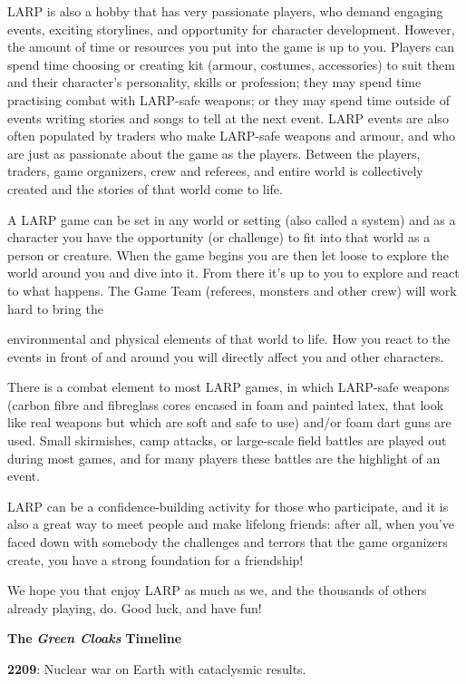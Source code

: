 \documentclass{scrbook}
\begin{document}
LARP is also a hobby that has very passionate players, who demand engaging events, exciting storylines, and opportunity for character development. However, the amount of time or resources you put into the game is up to you. Players can spend time choosing or creating kit (armour, costumes, accessories) to suit them and their character's personality, skills or profession; they may spend time practising combat with LARP-safe weapons; or they may spend time outside of events writing stories and songs to tell at the next event. LARP events are also often populated by traders who make LARP-safe weapons and armour, and who are just as passionate about the game as the players. Between the players, traders, game organizers, crew and referees, and entire world is collectively created and the stories of that world come to life.

A LARP game can be set in any world or setting (also called a system) and as a character you have the opportunity (or challenge) to fit into that world as a person or creature. When the game begins you are then let loose to explore the world around you and dive into it. From there it's up to you to explore and react to what happens. The Game Team (referees, monsters and other crew) will work hard to bring the

environmental and physical elements of that world to life. How you react to the events in front of and around you will directly affect you and other characters.

There is a combat element to most LARP games, in which LARP-safe weapons (carbon fibre and fibreglass cores encased in foam and painted latex, that look like real weapons but which are soft and safe to use) and/or foam dart guns are used. Small skirmishes, camp attacks, or large-scale field battles are played out during most games, and for many players these battles are the highlight of an event.

LARP can be a confidence-building activity for those who participate, and it is also a great way to meet people and make lifelong friends: after all, when you've faced down with somebody the challenges and terrors that the game organizers create, you have a strong foundation for a friendship!

We hope you that enjoy LARP as much as we, and the thousands of others already playing, do. Good luck, and have fun!

\textbf{The} \textbf{\textit{Green Cloaks}} \textbf{Timeline}

\textbf{2209}: Nuclear war on Earth with cataclysmic results.
\end{document}
